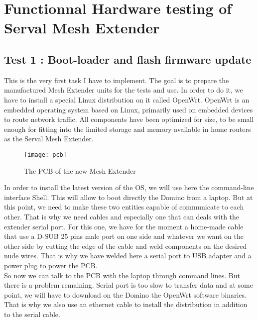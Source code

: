 \chapter{Functionnal Hardware testing of Serval Mesh Extender}

\section{Test 1 : Boot-loader and flash firmware update}

This is the very first task I have to implement. The goal is to prepare the manufactured Mesh Extender units for the tests and use. In order to do it, we have to install a special Linux distribution on it called OpenWrt. OpenWrt is an embedded operating system based on Linux, primarily used on embedded devices to route network traffic. All components have been optimized for size, to be small enough for fitting into the limited storage and memory available in home routers as the Serval Mesh Extender. \\

\begin{figure}[h]
\centering
\texttt{[image: pcb]}
\caption{The PCB of the new Mesh Extender}
\end{figure}

In order to install the latest version of the OS, we will use here the command-line interface Shell. This will allow to boot directly the Domino from a laptop. But at this point, we need to make these two entities capable of communicate to each other. That is why we need cables and especially one that can deals with the extender serial port. For this one, we have for the moment a home-made cable that use a D-SUB 25 pins male port on one side and whatever we want on the other side by cutting the edge of the cable and weld components on the desired nude wires. That is why we have welded here a serial port to USB adapter and a power plug to power the PCB. \\
So now we can talk to the PCB with the laptop through command lines. But there is a problem remaining. Serial port is too slow to transfer data and at some point, we will have to download on the Domino the OpenWrt software binaries. That is why we also use an ethernet cable to install the distribution in addition to the serial cable.
\\ 

